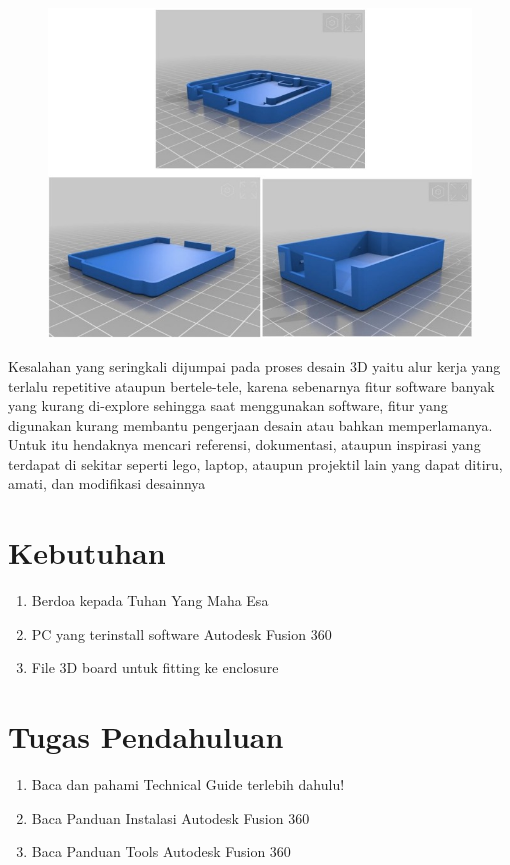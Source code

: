     \begin{figure}[H]
        \centering
        \includegraphics[width=1\linewidth]{P3/img/image2.jpg}
    \end{figure}

Kesalahan yang seringkali dijumpai pada proses desain 3D yaitu alur kerja yang terlalu repetitive ataupun
bertele-tele, karena sebenarnya fitur software banyak yang kurang di-explore sehingga saat
menggunakan software, fitur yang digunakan kurang membantu pengerjaan desain atau bahkan
memperlamanya. Untuk itu hendaknya mencari referensi, dokumentasi, ataupun inspirasi yang terdapat
di sekitar seperti lego, laptop, ataupun projektil lain yang dapat ditiru, amati, dan modifikasi desainnya

\section{Kebutuhan}
\begin{enumerate}
    \item Berdoa kepada Tuhan Yang Maha Esa
    \item PC yang terinstall software Autodesk Fusion 360
    \item File 3D board untuk fitting ke enclosure
\end{enumerate}

\section{Tugas Pendahuluan}
\begin{enumerate}
    \item Baca dan pahami Technical Guide terlebih dahulu!
    \item Baca Panduan Instalasi Autodesk Fusion 360
    \item Baca Panduan Tools Autodesk Fusion 360
\end{enumerate}

